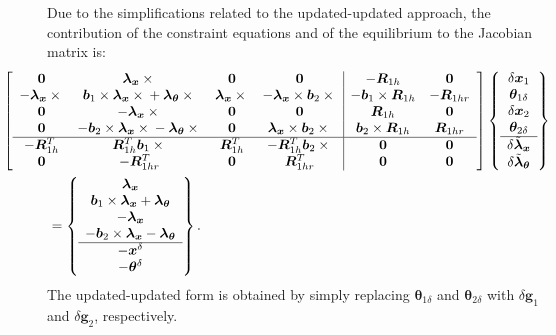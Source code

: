 \documentclass[10pt,fleqn,subeqn]{report}
\newcommand{\T}[1]{\bm{#1}}
\begin{document}
Due to the simplifications related to the updated-updated approach,
the contribution of the constraint equations and of the equilibrium 
to the Jacobian matrix is: 
\begin{align}
	\small
	&\hspace{-12mm}%
	\sqbr{\matr{cccc|cc}{
	\T{0} & 
	\T{\lambda}_{\T{x}}\times{} & 
	\T{0} & 
	\T{0} & 
	-\T{R}_{1h} &
	\T{0} \\
	-\T{\lambda}_{\T{x}}\times{} & 
	\T{b}_1\times\T{\lambda}_{\T{x}}\times{} + \T{\lambda}_{\T{\theta}}\times{} &
	\T{\lambda}_{\T{x}}\times{} & 
	-\T{\lambda}_{\T{x}}\times\T{b}_2\times{} & 
	-\T{b}_1\times\T{R}_{1h} &
	-\T{R}_{1hr} \\
	\T{0} & 
	-\T{\lambda}_{\T{x}}\times{} &
	\T{0} &
	\T{0} &
	\T{R}_{1h} &
	\T{0} \\
	\T{0} & 
	-\T{b}_2\times\T{\lambda}_{\T{x}}\times{} - \T{\lambda}_{\T{\theta}}\times{} &
	\T{0} &
	\T{\lambda}_{\T{x}}\times\T{b}_2\times{} &
	\T{b}_2\times\T{R}_{1h} & 
	\T{R}_{1hr} \\
	\hline
	-\T{R}_{1h}^T &
	\T{R}_{1h}^T\T{b}_1\times{} & 
	\T{R}_{1h}^T &
	-\T{R}_{1h}^T\T{b}_2\times{} & 
	\T{0} &
	\T{0} \\
	\T{0} &
	-\T{R}_{1hr}^T &
	\T{0} &
	\T{R}_{1hr}^T &
	\T{0} & 
	\T{0}
	}} \cubr{\cvvect{
		\delta\T{x}_1 \\
		\T{\theta}_{1\delta} \\
		\delta\T{x}_2 \\
		\T{\theta}_{2\delta} \\
		\hline
		\delta\tilde{\T{\lambda}}_{\T{x}} \\
		\delta\tilde{\T{\lambda}}_{\T{\theta}}
	}} \nonumber \\
	&= \cubr{\cvvect{
	\T{\lambda}_{\T{x}} \\
	\T{b}_1 \times \T{\lambda}_{\T{x}} + \T{\lambda}_{\T{\theta}} \\
	- \T{\lambda}_{\T{x}} \\
	- \T{b}_2 \times \T{\lambda}_{\T{x}} - \T{\lambda}_{\T{\theta}} \\
	\hline
	- \T{x}^{\delta} \\
	- \T{\theta}^{\delta}
	}} .
\end{align}
The updated-updated form is obtained by simply replacing
$\T{\theta}_{1\delta}$ and $\T{\theta}_{2\delta}$
with $\delta\T{g}_1$ and $\delta\T{g}_2$, respectively.
\end{document}
